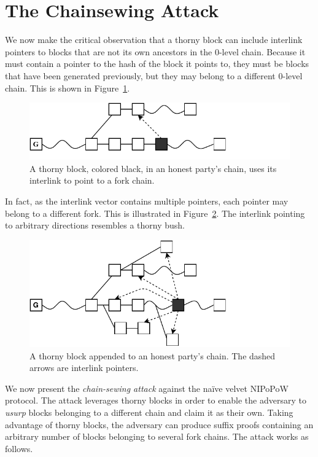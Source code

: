 \section{The Chainsewing Attack}
We now make the critical observation that a thorny block can include interlink
pointers to blocks that are not its own ancestors in the $0$-level chain.
Because it must contain a pointer to the hash of the block it points to, they
must be blocks that have been generated previously, but they may belong to a
different $0$-level chain. This is shown in Figure~\ref{fig:false_interlink}.

\begin{figure}[h]
	\begin{center}
		\includegraphics[width=0.8\columnwidth]{figures/false_interlink.pdf}
	\end{center}
    \caption{A thorny block, colored black, in an honest party's chain, uses its interlink to point to a fork chain.}
	\label{fig:false_interlink}
\end{figure}

In fact, as the interlink vector contains multiple pointers, each pointer may
belong to a different fork. This is illustrated in
Figure~\ref{fig:thorny_block}. The interlink pointing to arbitrary directions
resembles a thorny bush.

\begin{figure}[h]
	\begin{center}
		\includegraphics[width=0.8\columnwidth]{figures/thorny_block.pdf}
	\end{center}
	\caption{A thorny block appended to an honest party's chain.
	The dashed arrows are interlink pointers.}
	\label{fig:thorny_block}
\end{figure}

We now present the \emph{chain-sewing attack} against the na\"ive velvet NIPoPoW
protocol. The attack leverages thorny blocks in order to enable the adversary to
\emph{usurp} blocks belonging to a different chain and claim it as their own.
Taking advantage of thorny blocks, the adversary can produce suffix proofs
containing an arbitrary number of blocks belonging to several fork chains. The
attack works as follows.

